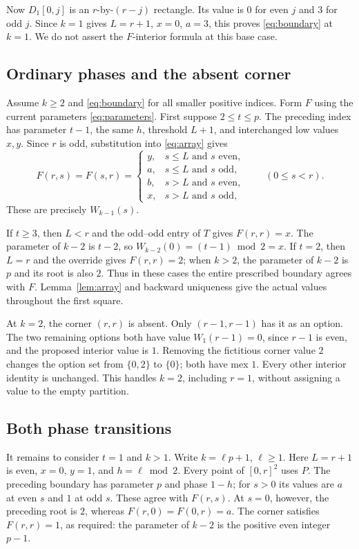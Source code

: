 \documentclass[11pt]{article}
\theoremstyle{remark}
\begin{document}
Now $D_1[0,j]$ is an $r$-by-$(r-j)$ rectangle. Its value is $0$
for even $j$ and $3$ for odd $j$. Since $k=1$ gives
$L=r+1$, $x=0$, $a=3$, this proves \eqref{eq:boundary} at $k=1$.
We do not assert the $F$-interior formula at this base case.

\subsection*{Ordinary phases and the absent corner}
Assume $k\geq2$ and \eqref{eq:boundary} for all smaller positive
indices. Form $F$ using the current parameters \eqref{eq:parameters}.
First suppose $2\leq t\leq p$. The preceding index has parameter
$t-1$, the same $h$, threshold $L+1$, and interchanged low values $x,y$.
Since $r$ is odd, substitution into \eqref{eq:array} gives
\begin{equation}\label{eq:ordinaryedge}
 F(r,s)=F(s,r)=
 \begin{cases}
 y,&s\leq L\text{ and }s\text{ even},\\
 a,&s\leq L\text{ and }s\text{ odd},\\
 b,&s>L\text{ and }s\text{ even},\\
 x,&s>L\text{ and }s\text{ odd},
 \end{cases}\qquad(0\leq s<r).
\end{equation}
These are precisely $W_{k-1}(s)$.

If $t\geq3$, then $L<r$ and the odd--odd entry of $T$ gives
$F(r,r)=x$. The parameter of $k-2$ is $t-2$, so
$W_{k-2}(0)=(t-1)\bmod2=x$. If $t=2$, then $L=r$ and the
override gives $F(r,r)=2$; when $k>2$, the parameter of $k-2$ is $p$
and its root is also $2$. Thus in these cases the entire prescribed
boundary agrees with $F$. Lemma~\ref{lem:array} and backward uniqueness
give the actual values throughout the first square.

At $k=2$, the corner $(r,r)$ is absent. Only $(r-1,r-1)$ has it
as an option. The two remaining options both have value
$W_1(r-1)=0$, since $r-1$ is even, and the proposed interior value
is $1$. Removing the fictitious corner value $2$ changes the option
set from $\{0,2\}$ to $\{0\}$; both have mex $1$. Every other
interior identity is unchanged. This handles $k=2$, including $r=1$,
without assigning a value to the empty partition.

\subsection*{Both phase transitions}
It remains to consider $t=1$ and $k>1$. Write $k=\ell p+1$,
$\ell\geq1$. Here $L=r+1$ is even, $x=0$, $y=1$, and
$h=\ell\bmod2$. Every point of $[0,r]^2$ uses $P$.
The preceding boundary has parameter $p$ and phase $1-h$; for $s>0$
its values are $a$ at even $s$ and $1$ at odd $s$. These agree with
$F(r,s)$. At $s=0$, however, the preceding root is $2$, whereas
$F(r,0)=F(0,r)=a$. The corner satisfies $F(r,r)=1$, as required:
the parameter of $k-2$ is the positive even integer $p-1$.
\end{document}
